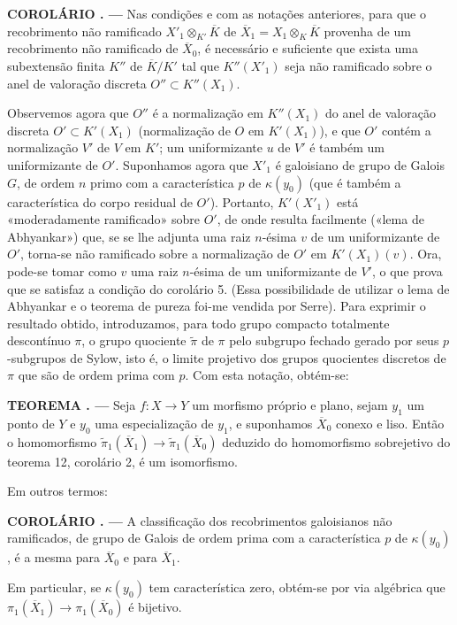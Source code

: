 \documentclass[11pt,twoside,openany]{book}
\numberwithin{equation}{section}
\newcommand{\src}[1]{%
  \phantomsection\hypertarget{src:#1}{}%
  \marginpar{\raggedleft\footnotesize\sffamily #1}%
}
\theoremstyle{plain}
\theoremstyle{definition}
\theoremstyle{remark}
\newcommand{\result}[2]{%
  \par\medskip\noindent\textbf{#1%
  \if\relax\detokenize{#2}\relax\else\space#2\fi. ---}\enspace
}
\newcommand{\FgaUnitKey}{frontmatter}
\renewcommand{\src}[1]{%
  \phantomsection\hypertarget{src:\FgaUnitKey:#1}{}%
  \marginpar{\raggedleft\footnotesize\sffamily #1}%
}
\begin{document}
\src{218}
\result{COROLÁRIO}{5} Nas condições e com as notações anteriores, para
que o recobrimento não ramificado
$X'_1\otimes_{K'}\overline K$ de
$\overline X_1=X_1\otimes_K\overline K$ provenha de um recobrimento não
ramificado de $\overline X_0$, é necessário e suficiente que exista uma
subextensão finita $K''$ de $\overline K/K'$ tal que $K''(X'_1)$ seja não
ramificado sobre o anel de valoração discreta $O''\subset K''(X_1)$.

Observemos agora que $O''$ é a normalização em $K''(X_1)$ do anel de
valoração discreta $O'\subset K'(X_1)$ (normalização de $O$ em $K'(X_1)$), e
que $O'$ contém a normalização $V'$ de $V$ em $K'$; um uniformizante $u$ de
$V'$ é também um uniformizante de $O'$. Suponhamos agora que $X'_1$ é
galoisiano de grupo de Galois $G$, de ordem $n$ primo com a característica $p$
de $\kappa(y_0)$ (que é também a característica do corpo residual de
$O'$). Portanto, $K'(X'_1)$ está «moderadamente ramificado» sobre $O'$, de onde
resulta facilmente («lema de Abhyankar») que, se se lhe adjunta uma raiz
$n$-ésima $v$ de um uniformizante de $O'$, torna-se não ramificado sobre a
normalização de $O'$ em $K'(X_1)(v)$. Ora, pode-se tomar como $v$ uma
raiz $n$-ésima de um uniformizante de $V'$, o que prova que se satisfaz a
condição do corolário 5. (Essa possibilidade de utilizar o lema de Abhyankar e
o teorema de pureza foi-me vendida por Serre). Para exprimir o resultado
obtido, introduzamos, para todo grupo compacto totalmente descontínuo $\pi$,
o grupo quociente $\widetilde\pi$ de $\pi$ pelo subgrupo fechado gerado
por seus $p$-subgrupos de Sylow, isto é, o limite projetivo dos grupos
quocientes discretos de $\pi$ que são de ordem prima com $p$. Com esta notação,
obtém-se:

\result{TEOREMA}{13} Seja $f:X\longrightarrow Y$ um morfismo próprio e plano,
sejam $y_1$ um ponto de $Y$ e $y_0$ uma especialização de $y_1$, e suponhamos
$\overline X_0$ conexo e liso. Então o homomorfismo
$\widetilde\pi_1(\overline X_1)\longrightarrow
\widetilde\pi_1(\overline X_0)$ deduzido do homomorfismo sobrejetivo do
teorema 12, corolário 2, é um isomorfismo.

Em outros termos:

\src{219}
\result{COROLÁRIO}{1} A classificação dos recobrimentos galoisianos não
ramificados, de grupo de Galois de ordem prima com a característica $p$ de
$\kappa(y_0)$, é a mesma para $\overline X_0$ e para $\overline X_1$.

Em particular, se $\kappa(y_0)$ tem característica zero, obtém-se por via
algébrica que $\pi_1(\overline X_1)\longrightarrow\pi_1(\overline X_0)$ é
bijetivo.
\end{document}
